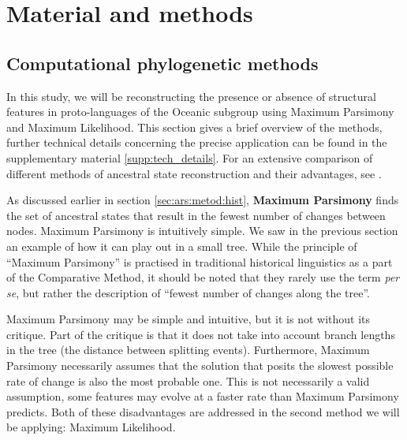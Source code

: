 \documentclass[draft,10pt]{article} %
\begin{document}

\section{Material and methods}
\subsection{Computational phylogenetic methods}
\label{sec:asr_methods}

In this study, we will be reconstructing the presence or absence of structural features in proto-languages of the Oceanic subgroup using Maximum Parsimony and Maximum Likelihood. This section gives a brief overview of the methods, further technical details concerning the precise application can be found in the supplementary material \ref{supp:tech_details}. For an extensive comparison of different methods of ancestral state reconstruction and their advantages, see \citet{joy2016ancestral}.

As discussed earlier in section \ref{sec:ars:metod:hist}, \textbf{Maximum Parsimony} finds the set of ancestral states that result in the fewest number of changes between nodes. Maximum Parsimony is intuitively simple. We saw in the previous section an example of how it can play out in a small tree. While the principle of ``Maximum Parsimony'' is practised in traditional historical linguistics as a part of the Comparative Method, it should be noted that they rarely use the term \emph{per se}, but rather the description of ``fewest number of changes along the tree''.

Maximum Parsimony may be simple and intuitive, but it is not without its critique. Part of the critique is that it does not take into account branch lengths in the tree (the distance between splitting events). Furthermore, Maximum Parsimony necessarily assumes that the solution that posits the slowest possible rate of change is also the most probable one. This is not necessarily a valid assumption, some features may evolve at a faster rate than Maximum Parsimony predicts. Both of these disadvantages are addressed in the second method we will be applying: Maximum Likelihood.
\end{document}
